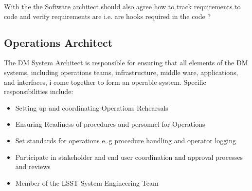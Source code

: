 With the  the Software architect should also agree how to track requirements to code and verify requirements are i.e. are hooks required in the code ?
\subsection{Operations Architect \label{role:sysarc}}
The DM System Architect is responsible for ensuring that all elements of the DM systems, including operations teams, infrastructure, middle ware, applications, and interfaces, i
come together to form an operable system. 
Specific responsibilities include:
\begin{itemize}
\item Setting up and coordinating  Operations Rehearsals
\item Ensuring Readiness of procedures and personnel for Operations
\item Set standards for operations e..g procedure handling and operator logging
\item Participate in stakeholder and end user coordination and approval processes and reviews
\item Member of the LSST System Engineering Team
\end{itemize}


